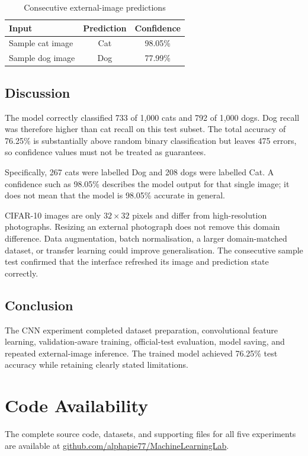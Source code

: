 \documentclass[12pt,a4paper]{report}
\begin{document}
\begin{table}[H]\centering
\caption{Consecutive external-image predictions}
\begin{tabular}{lcc}\toprule
Input&Prediction&Confidence\\\midrule
Sample cat image&Cat&98.05\%\\
Sample dog image&Dog&77.99\%\\\bottomrule
\end{tabular}\end{table}

\section{Discussion}
The model correctly classified 733 of 1,000 cats and 792 of 1,000 dogs. Dog recall was therefore higher than cat recall on this test subset. The total accuracy of 76.25\% is substantially above random binary classification but leaves 475 errors, so confidence values must not be treated as guarantees.

Specifically, 267 cats were labelled Dog and 208 dogs were labelled Cat. A confidence such as 98.05\% describes the model output for that single image; it does not mean that the model is 98.05\% accurate in general.

CIFAR-10 images are only $32\times32$ pixels and differ from high-resolution photographs. Resizing an external photograph does not remove this domain difference. Data augmentation, batch normalisation, a larger domain-matched dataset, or transfer learning could improve generalisation. The consecutive sample test confirmed that the interface refreshed its image and prediction state correctly.

\section{Conclusion}
The CNN experiment completed dataset preparation, convolutional feature learning, validation-aware training, official-test evaluation, model saving, and repeated external-image inference. The trained model achieved 76.25\% test accuracy while retaining clearly stated limitations.

\chapter*{Code Availability}
The complete source code, datasets, and supporting files for all five experiments are available at \href{https://github.com/alphapie77/MachineLearningLab}{github.com/alphapie77/MachineLearningLab}.
\end{document}
